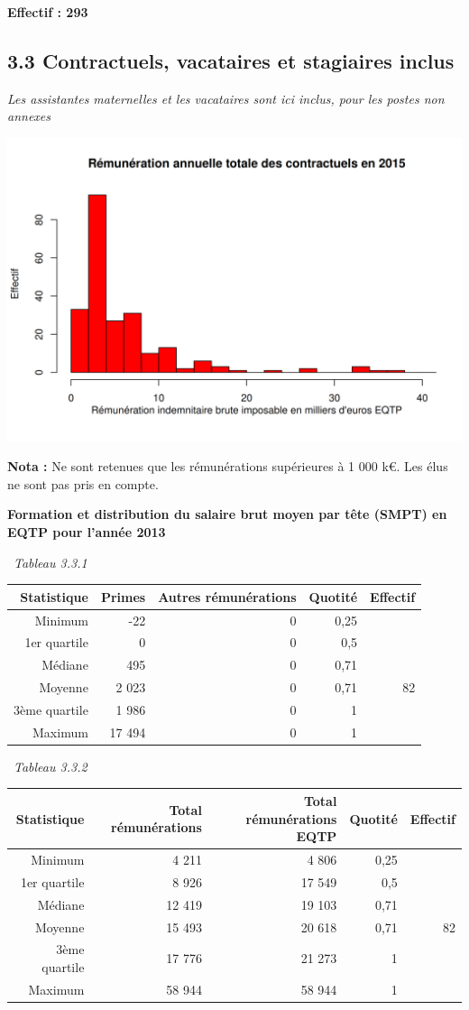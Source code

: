 \textbf{Effectif : 293 }

\hypertarget{contractuels-vacataires-et-stagiaires-inclus-1}{%
\subsection{3.3 Contractuels, vacataires et stagiaires
inclus}\label{contractuels-vacataires-et-stagiaires-inclus-1}}

\emph{Les assistantes maternelles et les vacataires sont ici inclus,
pour les postes non annexes}

\includegraphics{altair_files/figure-latex/unnamed-chunk-94-1.png}

\textbf{Nota :} Ne sont retenues que les rémunérations supérieures à 1
000 k€. Les élus ne sont pas pris en compte.

\textbf{Formation et distribution du salaire brut moyen par tête (SMPT)
en EQTP pour l'année 2013 }

~\emph{Tableau 3.3.1}

\begin{longtable}[]{@{}rrrrr@{}}
\toprule
Statistique & Primes & Autres rémunérations & Quotité &
Effectif\tabularnewline
\midrule
\endhead
Minimum & -22 & 0 & 0,25 &\tabularnewline
1er quartile & 0 & 0 & 0,5 &\tabularnewline
Médiane & 495 & 0 & 0,71 &\tabularnewline
Moyenne & 2 023 & 0 & 0,71 & 82\tabularnewline
3ème quartile & 1 986 & 0 & 1 &\tabularnewline
Maximum & 17 494 & 0 & 1 &\tabularnewline
\bottomrule
\end{longtable}

~\emph{Tableau 3.3.2}

\begin{longtable}[]{@{}rrrrr@{}}
\toprule
Statistique & Total rémunérations & Total rémunérations EQTP & Quotité &
Effectif\tabularnewline
\midrule
\endhead
Minimum & 4 211 & 4 806 & 0,25 &\tabularnewline
1er quartile & 8 926 & 17 549 & 0,5 &\tabularnewline
Médiane & 12 419 & 19 103 & 0,71 &\tabularnewline
Moyenne & 15 493 & 20 618 & 0,71 & 82\tabularnewline
3ème quartile & 17 776 & 21 273 & 1 &\tabularnewline
Maximum & 58 944 & 58 944 & 1 &\tabularnewline
\bottomrule
\end{longtable}

